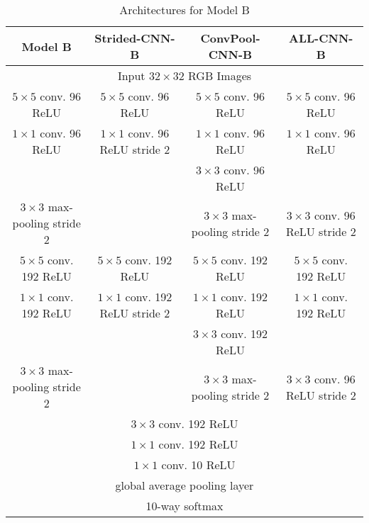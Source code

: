 \begin{table*}
  \centering
  \begin{tabular}{|c|c|c|c|}
    \hline
    Model B & Strided-CNN-B & ConvPool-CNN-B & ALL-CNN-B \\
    \hline
    \multicolumn{4}{|c|}{Input $32\times32$ RGB Images} \\
    \hline
    $5\times5$ conv. 96 ReLU & $5\times5$ conv. 96 ReLU &  $5\times5$ conv. 96 ReLU & $5\times5$ conv. 96 ReLU \\
    $1\times1$ conv. 96 ReLU & $1\times1$ conv. 96 ReLU stride 2 &  $1\times1$ conv. 96 ReLU & $1\times1$ conv. 96 ReLU \\
    & & $3\times3$ conv. 96 ReLU & \\
    \hline
    $3\times3$ max-pooling stride 2 & & $3\times3$ max-pooling stride 2& $3\times3$ conv. 96 ReLU stride 2 \\
    \hline
    $5\times5$ conv. 192 ReLU & $5\times5$ conv. 192 ReLU &  $5\times5$ conv. 192 ReLU & $5\times5$ conv. 192 ReLU \\
    $1\times1$ conv. 192 ReLU & $1\times1$ conv. 192 ReLU stride 2 &  $1\times1$ conv. 192 ReLU & $1\times1$ conv. 192 ReLU \\
    & & $3\times3$ conv. 192 ReLU & \\
    \hline
    $3\times3$ max-pooling stride 2 & & $3\times3$ max-pooling stride 2& $3\times3$ conv. 96 ReLU stride 2 \\
    \hline
    \multicolumn{4}{|c|}{$3\times3$ conv. 192 ReLU} \\
    \hline
    \multicolumn{4}{|c|}{$1\times1$ conv. 192 ReLU} \\
    \hline
    \multicolumn{4}{|c|}{$1\times1$ conv. 10 ReLU} \\
    \hline
    \multicolumn{4}{|c|}{global average pooling layer} \\
    \hline
    \multicolumn{4}{|c|}{10-way softmax} \\
    \hline
  \end{tabular}
  \caption{Architectures for Model B}
  \label{tab:modelB}
\end{table*}

